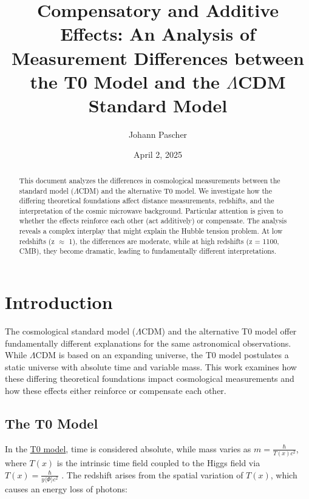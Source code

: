 \documentclass[a4paper,12pt]{article}
\newcommand{\Tfield}{T(x)}
\newcommand{\repobase}{https://github.com/jpascher/T0-Time-Mass-Duality/tree/main/2/}
\begin{document}
	
	\title{Compensatory and Additive Effects: An Analysis of Measurement Differences between the T0 Model and the $\Lambda$CDM Standard Model}
	\author{Johann Pascher}
	\date{April 2, 2025}
	\maketitle
	
	\begin{abstract}
		This document analyzes the differences in cosmological measurements between the standard model ($\Lambda$CDM) and the alternative T0 model. We investigate how the differing theoretical foundations affect distance measurements, redshifts, and the interpretation of the cosmic microwave background. Particular attention is given to whether the effects reinforce each other (act additively) or compensate. The analysis reveals a complex interplay that might explain the Hubble tension problem. At low redshifts (z $\approx$ 1), the differences are moderate, while at high redshifts (z = 1100, CMB), they become dramatic, leading to fundamentally different interpretations.
	\end{abstract}
	
	\tableofcontents
	\newpage
	
	\section{Introduction}
	
	The cosmological standard model ($\Lambda$CDM) and the alternative T0 model offer fundamentally different explanations for the same astronomical observations. While $\Lambda$CDM is based on an expanding universe, the T0 model postulates a static universe with absolute time and variable mass. This work examines how these differing theoretical foundations impact cosmological measurements and how these effects either reinforce or compensate each other.
	
	\subsection{The T0 Model}
	
	In the {\small\href{\repobase/pdf/English/Wesentliche mathematische Formalismen der Zeit-Masse-Dualitätstheorie mit Lagrange-Dichten_en.pdf}{T0 model}}, time is considered absolute, while mass varies as \( m = \frac{\hbar}{\Tfield c^2} \), where \( \Tfield \) is the intrinsic time field coupled to the Higgs field via \( \Tfield = \frac{\hbar}{y \langle \Phi \rangle c^2} \) \cite{pascher_galaxies_2025}. The redshift arises from the spatial variation of \( \Tfield \), which causes an energy loss of photons:
	
\end{document}

